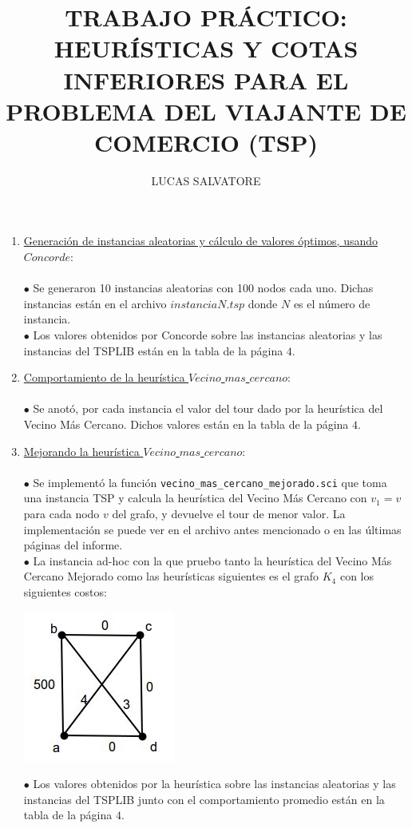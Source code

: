 \documentclass[10pt,a4paper]{report}
\title{TRABAJO PR\'ACTICO: HEUR\'ISTICAS Y COTAS INFERIORES PARA EL PROBLEMA DEL VIAJANTE DE COMERCIO (TSP)}
\author{LUCAS SALVATORE}
\date{}
\begin{document}
\maketitle
\begin{enumerate}
\item \underline{Generaci\'on de instancias aleatorias y c\'alculo de valores \'optimos, usando $Concorde$}:\\\\
$\bullet$ Se generaron 10 instancias aleatorias con 100 nodos cada uno. Dichas instancias est\'an en el archivo $instanciaN.tsp$ donde $N$ es el n\'umero de instancia.\\
$\bullet$ Los valores obtenidos por Concorde sobre las instancias aleatorias y las instancias del TSPLIB est\'an en la tabla de la p\'agina $4$.
\item \underline{Comportamiento de la heur\'istica $Vecino$ $mas$ $cercano$}:\\\\
$\bullet$ Se anot\'o, por cada instancia el valor del tour dado por la heur\'istica del Vecino M\'as Cercano. Dichos valores est\'an en la tabla de la p\'agina $4$.
\item \underline{Mejorando la heur\'istica $Vecino$ $mas$ $cercano$}:\\\\
$\bullet$ Se implement\'o la funci\'on \texttt{vecino\_mas\_cercano\_mejorado.sci} que toma una instancia TSP y calcula la heur\'istica del Vecino M\'as Cercano con $v_1 = v$ para cada nodo $v$ del grafo, y devuelve el tour de menor valor. La implementaci\'on se puede ver en el archivo antes mencionado o en las \'ultimas p\'aginas del informe.\\
$\bullet$ La instancia ad-hoc con la que pruebo tanto la heur\'istica del Vecino M\'as Cercano Mejorado como las heur\'isticas siguientes es el grafo $K_4$ con los siguientes costos:
\begin{center}
\includegraphics[scale=0.9]{K4.jpg}
\end{center}
$\bullet$ Los valores obtenidos por la heur\'istica sobre las instancias aleatorias y las instancias del TSPLIB junto con el comportamiento promedio est\'an en la tabla de la p\'agina $4$.

\end{enumerate}
\end{document}
